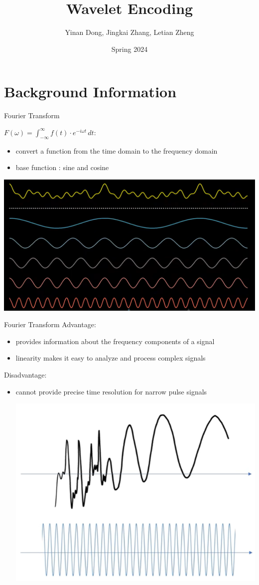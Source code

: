 \documentclass{beamer}
\title{Wavelet Encoding}
\author{Yinan Dong, Jingkai Zhang, Letian Zheng}
\date{Spring 2024}
\begin{document}
\maketitle

\section{Background Information}

\begin{frame}{Fourier Transform}

	$F(\omega) = \int_{-\infty}^{\infty} f(t) \cdot e^{-i\omega t} \, dt$:
	\begin{itemize}
		\item  convert a function from the time domain to the frequency domain
		\item base function : sine and cosine
	\end{itemize}
	
	\centering
	\includegraphics[width=.8\columnwidth]{Image/p1.png}

\medskip
	
\end{frame}

\begin{frame}{Fourier Transform}
	Advantage:
	\begin{itemize}
	\item  provides information about the frequency components of a signal
		\item  linearity makes it easy to analyze and process complex signals
	\end{itemize}
	
	Disadvantage:
	\begin{itemize}
		\item  cannot provide precise time resolution for narrow pulse signals
	
		\includegraphics[width=.6\columnwidth]{Image/p2.png}
			
	\end{itemize}
\end{frame}
\end{document}
